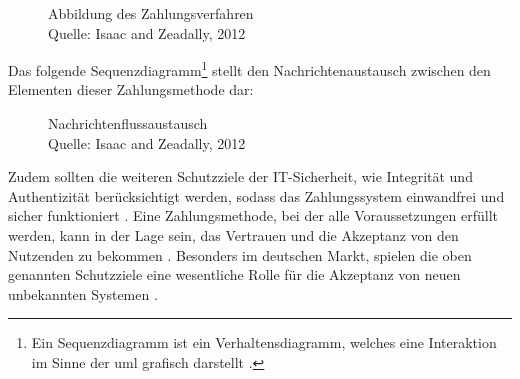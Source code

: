 \begin{figure}[H]
    \caption{Abbildung des Zahlungsverfahren\\ Quelle: Isaac and Zeadally, 2012}
    \label{fig:refart:JTAS}
\end{figure}

Das folgende Sequenzdiagramm\footnote{Ein Sequenzdiagramm ist ein Verhaltensdiagramm, welches eine Interaktion
im Sinne der \acrfull{uml} grafisch darstellt \cite{refbook:IASE}.} stellt den 
Nachrichtenaustausch zwischen den Elementen dieser Zahlungsmethode dar:

\vfill
\begin{figure}[H]
    \caption{Nachrichtenflussaustausch \\ Quelle: Isaac and Zeadally, 2012}
    \label{fig:refart:JTAS_2}
\end{figure}

Zudem sollten die weiteren Schutzziele der IT-Sicherheit, wie Integrität und Authentizität berücksichtigt werden, 
sodass das Zahlungssystem einwandfrei und sicher funktioniert \cite{refip:GMPS}. Eine Zahlungsmethode, bei der 
alle Voraussetzungen erfüllt werden, kann in der Lage sein, das Vertrauen und die Akzeptanz von den Nutzenden 
zu bekommen \cite{refart:HARE}. Besonders im deutschen Markt, spielen die oben genannten Schutzziele eine 
wesentliche Rolle für die Akzeptanz von neuen unbekannten Systemen \cite{refip:DKAM}.

